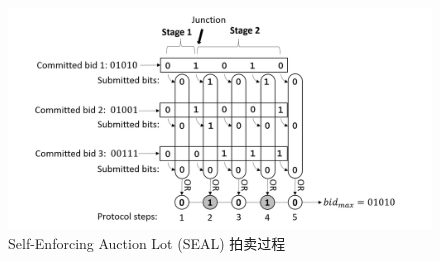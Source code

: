 \begin{figure}[h]
    \centering
    \includegraphics*[width=\textwidth]{figure/Bag2020.png}
    \caption{Self-Enforcing Auction Lot (SEAL) 拍卖过程}
    \label{fig:Bag2020}
\end{figure}